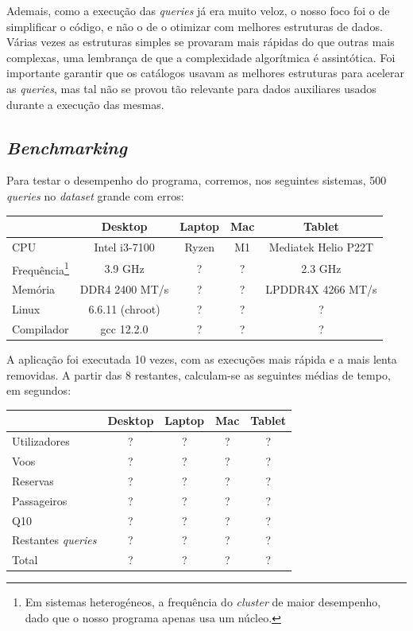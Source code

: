 \documentclass[12pt, a4paper]{article}
\begin{document}
Ademais, como a execução das \emph{queries} já era muito veloz, o nosso foco foi o de simplificar
o código, e não o de o otimizar com melhores estruturas de dados. Várias vezes as estruturas simples
se provaram mais rápidas do que outras mais complexas, uma lembrança de que a complexidade
algorítmica é assintótica. Foi importante garantir que os catálogos usavam as
melhores estruturas para acelerar as \emph{queries}, mas tal não se provou tão relevante para dados
auxiliares usados durante a execução das mesmas.

\subsection{\emph{Benchmarking}}
\label{sec:benchmarking}

Para testar o desempenho do programa, corremos, nos seguintes sistemas, 500 \emph{queries} no
\emph{dataset} grande com erros:

\begin{center}
    \begin{tabular}{|l|c|c|c|c|}
        \hline
        & Desktop & Laptop & Mac & Tablet \\
        \hline
        CPU & Intel i3-7100 & Ryzen & M1 & Mediatek Helio P22T \\
        \hline
        Frequência\footnote{Em sistemas heterogéneos, a frequência do \emph{cluster} de maior
                            desempenho, dado que o nosso programa apenas usa um núcleo.} &
        3.9 GHz & ? & ? & 2.3 GHz \\
        \hline
        Memória & DDR4 2400 MT/s & ? & ? & LPDDR4X 4266 MT/s \\
        \hline
        Linux & 6.6.11 (chroot) & ? & ? & ? \\
        \hline
        Compilador & gcc 12.2.0 & ? & ? & ? \\
        \hline
    \end{tabular}
\end{center}

A aplicação foi executada 10 vezes, com as execuções mais rápida e a mais lenta removidas. A partir
das 8 restantes, calculam-se as seguintes médias de tempo, em segundos:

\begin{center}
    \begin{tabular}{|l|c|c|c|c|}
        \hline
        & Desktop & Laptop & Mac & Tablet \\
        \hline
        Utilizadores & ? & ? & ? & ? \\
        \hline
        Voos & ? & ? & ? & ? \\
        \hline
        Reservas & ? & ? & ? & ? \\
        \hline
        Passageiros & ? & ? & ? & ? \\
        \hline
        Q10 & ? & ? & ? & ? \\
        \hline
        Restantes \emph{queries} & ? & ? & ? & ? \\
        \hline
        Total & ? & ? & ? & ? \\
        \hline
    \end{tabular}
\end{center}
\end{document}
